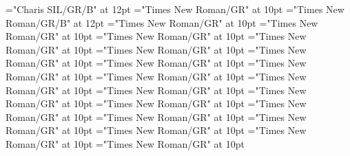 \documentclass[gps1,twoside]{article}
\begin{document}
\font\spanbzhheadwordreferencedentryreferencedentriescomplexformentryrefcomplexformentryrefsminorentrycomplex="Charis SIL/GR/B" at 12pt
\font\spanspanheadwordreferencedentryreferencedentriescomplexformentryrefcomplexformentryrefsminorentrycomplexbefore="Times New Roman/GR" at 10pt
\font\spanheadwordreferencedentryreferencedentriescomplexformentryrefcomplexformentryrefsminorentrycomplex="Times New Roman/GR/B" at 12pt
\font\spanspandefinitionorglossreferencedentryreferencedentriescomplexformentryrefcomplexformentryrefsminorentrycomplexbefore="Times New Roman/GR" at 10pt
\font\spandefinitionorglossreferencedentryreferencedentriescomplexformentryrefcomplexformentryrefsminorentrycomplexfirstchildbefore="Times New Roman/GR" at 10pt
\font\spanspansummarycomplexformentryrefcomplexformentryrefsminorentrycomplexbefore="Times New Roman/GR" at 10pt
\font\spansummarycomplexformentryrefcomplexformentryrefsminorentrycomplexfirstchildbefore="Times New Roman/GR" at 10pt
\font\nontrivialentryrootnontrivialentryrootnontrivialentryrootscomplexformentryrefcomplexformentryrefsminorentrycomplexbefore="Times New Roman/GR" at 10pt
\font\nontrivialentryrootscomplexformentryrefcomplexformentryrefsminorentrycomplexbefore="Times New Roman/GR" at 10pt
\font\spanspansummarydefinitionminorentrycomplexbefore="Times New Roman/GR" at 10pt
\font\spansummarydefinitionminorentrycomplexfirstchildbefore="Times New Roman/GR" at 10pt
\font\spansummarydefinitionminorentrycomplexlastchildafter="Times New Roman/GR" at 10pt
\font\spanspanvisiblecomplexformbackrefsminorentrycomplexbefore="Times New Roman/GR" at 10pt
\font\visiblecomplexformbackrefsminorentrycomplexbefore="Times New Roman/GR" at 10pt
\font\visiblecomplexformbackrefsminorentrycomplexafter="Times New Roman/GR" at 10pt
\font\complexformtypesvisiblecomplexformbackrefvisiblecomplexformbackrefsminorentrycomplexafter="Times New Roman/GR" at 10pt
\font\spanspanreverseabbrcomplexformtypecomplexformtypesvisiblecomplexformbackrefvisiblecomplexformbackrefsminorentrycomplexbefore="Times New Roman/GR" at 10pt
\font\spanspanheadwordvisiblecomplexformbackrefvisiblecomplexformbackrefsminorentrycomplexbefore="Times New Roman/GR" at 10pt
\font\spanspandefinitionorglossesvisiblecomplexformbackrefvisiblecomplexformbackrefsminorentrycomplexbefore="Times New Roman/GR" at 10pt
\font{}="Times New Roman/GR" at 10pt
\font\spanspanowningentrysummarydefinitionvisiblecomplexformbackrefvisiblecomplexformbackrefsminorentrycomplexbefore="Times New Roman/GR" at 10pt
\font\spanowningentrysummarydefinitionvisiblecomplexformbackrefvisiblecomplexformbackrefsminorentrycomplexfirstchildbefore="Times New Roman/GR" at 10pt
\end{document}
